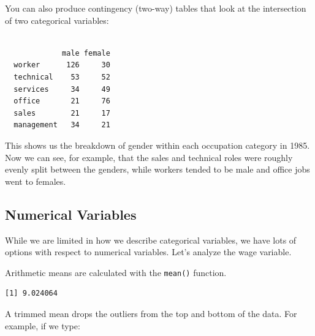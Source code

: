 \documentclass[
  letterpaper,
]{book}
\newenvironment{Shaded}{\begin{snugshade}}{\end{snugshade}}
\newcommand{\AttributeTok}[1]{\textcolor[rgb]{0.40,0.45,0.13}{#1}}
\newcommand{\FloatTok}[1]{\textcolor[rgb]{0.68,0.00,0.00}{#1}}
\newcommand{\FunctionTok}[1]{\textcolor[rgb]{0.28,0.35,0.67}{#1}}
\newcommand{\NormalTok}[1]{\textcolor[rgb]{0.00,0.23,0.31}{#1}}
\newcommand{\SpecialCharTok}[1]{\textcolor[rgb]{0.37,0.37,0.37}{#1}}
\begin{document}
You can also produce contingency (two-way) tables that look at the
intersection of two categorical variables:

\begin{Shaded}
\end{Shaded}

\begin{verbatim}
            
             male female
  worker      126     30
  technical    53     52
  services     34     49
  office       21     76
  sales        21     17
  management   34     21
\end{verbatim}

This shows us the breakdown of gender within each occupation category in
1985. Now we can see, for example, that the sales and technical roles
were roughly evenly split between the genders, while workers tended to
be male and office jobs went to females.

\subsection{Numerical Variables}\label{numerical-variables}

While we are limited in how we describe categorical variables, we have
lots of options with respect to numerical variables. Let's analyze the
wage variable.

Arithmetic means are calculated with the \texttt{mean()} function.

\begin{Shaded}
\end{Shaded}

\begin{verbatim}
[1] 9.024064
\end{verbatim}

A trimmed mean drops the outliers from the top and bottom of the data.
For example, if we type:

\begin{Shaded}
\end{Shaded}
\end{document}
